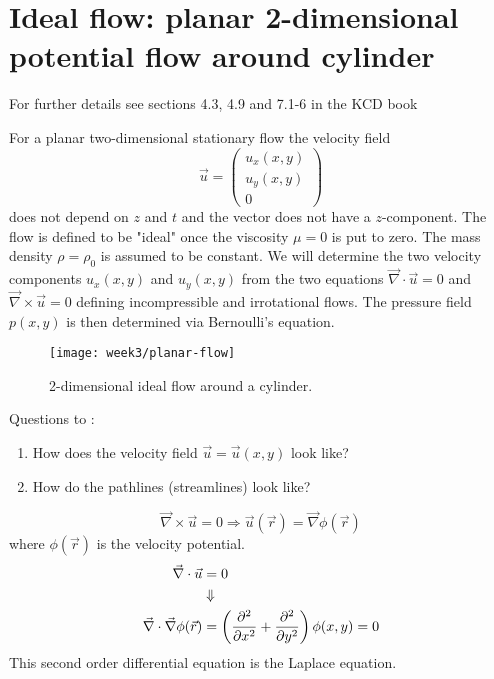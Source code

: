 \section{Ideal flow: planar 2-dimensional potential flow around cylinder}

\begin{framed}
For further details see sections 4.3, 4.9 and 7.1-6 in the KCD book
\end{framed}

For a planar two-dimensional stationary flow the velocity field
\begin{equation}
\vec{u}=
\begin{pmatrix}
u_x(x,y)\\u_y(x,y)\\0
\end{pmatrix}
\end{equation}
does not depend on $z$ and $t$ and the vector does not have a $z$-component. The flow is defined to be "ideal" once the viscosity $\mu=0$ is put to zero. The mass density $\rho=\rho_0$ is assumed to be constant. We will determine the two velocity components $u_x(x,y)$ and $u_y(x,y)$ from the two equations $\vec{\nabla}\cdot\vec{u}=0$ and $\vec{\nabla}\times\vec{u}=0$ defining incompressible and irrotational flows. The pressure field $p(x,y)$ is then determined via Bernoulli's equation.

\begin{figure}[!h]
    \centering
    \texttt{[image: week3/planar-flow]}
    \caption{2-dimensional ideal flow around a cylinder.}
    \label{fig:planar-flow}
\end{figure}

Questions to :
\begin{enumerate}
\item How does the velocity field $\vec{u} = \vec{u}(x,y)$ look like?
\item How do the pathlines (streamlines) look like?
\end{enumerate}
\begin{equation}
\vec{\nabla}\times\vec{u} = 0 \Rightarrow \vec{u}(\vec{r}) = \vec{\nabla}\phi(\vec{r})
\end{equation}
where $\phi(\vec{r})$ is the velocity potential.
\begin{align}
\vec{\nabla}\cdot\vec{u} &= 0\\
&\Downarrow\notag\\
\vec{\nabla}\cdot\vec{\nabla}\phi(\vec{r}) &= \left(\frac{\partial^2 }{\partial x^2}+\frac{\partial^2 }{\partial y^2}\right)\phi(x,y) = 0
\end{align}
This second order differential equation is the Laplace equation.

